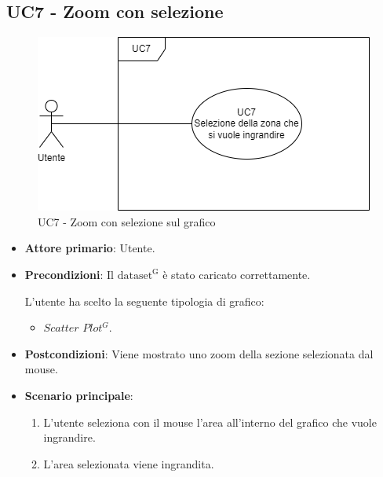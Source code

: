 \subsection{UC7 - Zoom con selezione}
\label{sec:UC7}
\begin{figure}[h!]
    \centering
    \includegraphics[scale=0.60]{../../assets/zoom_selezione.png}
    \caption{UC7 - Zoom con selezione sul grafico}
\end{figure}
\begin{itemize}
    \item \textbf{Attore primario}: Utente.
    \item \textbf{Precondizioni}: Il ${\mathrm{dataset^{G}}}$ è stato caricato correttamente. \par L'utente ha scelto la seguente tipologia di grafico:
    \begin{itemize}
    		\item $Scatter$ $Plot^{G}$.
    \end{itemize}
    \item \textbf{Postcondizioni}: Viene mostrato uno zoom della sezione selezionata dal mouse.
    \item \textbf{Scenario principale}:
          \begin{enumerate}
              \item L'utente seleziona con il mouse l'area all'interno del grafico che vuole ingrandire.
              \item L'area selezionata viene ingrandita.
          \end{enumerate}
\end{itemize}

